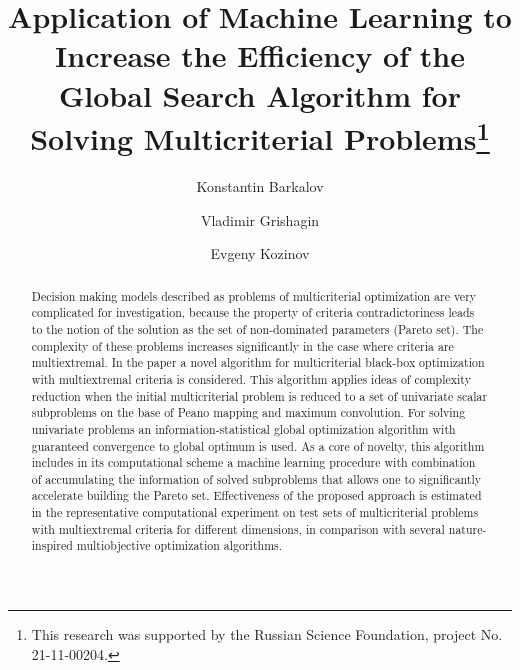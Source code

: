 \documentclass[runningheads]{llncs}
\begin{document}
%
\title{Application of Machine Learning to Increase the Efficiency of the Global Search Algorithm for Solving Multicriterial Problems\thanks{This research was supported by the Russian Science Foundation, project No. 21-11-00204.}}
%
%
\author{Konstantin Barkalov \and
Vladimir Grishagin \and
Evgeny Kozinov}
%
%

%
\maketitle              %
%
	\begin{abstract}
Decision making models described as problems of multicriterial optimization are very complicated for investigation, because the property of criteria contradictoriness leads to the notion of the solution as the set of non-dominated parameters (Pareto set). The complexity of these problems increases significantly in the case where criteria are multiextremal.
In the paper a novel algorithm for multicriterial black-box optimization with multiextremal criteria is considered. This algorithm applies ideas of complexity reduction when the initial multicriterial problem is reduced to a set of univariate scalar subproblems on the base of Peano mapping and maximum convolution. For solving univariate problems an information-statistical global optimization algorithm with guaranteed convergence to global optimum is used. As a core of novelty, this algorithm includes in its computational scheme a machine learning procedure with combination of accumulating the information of solved subproblems that allows one to significantly accelerate building the Pareto set.
Effectiveness of the proposed approach is estimated in the representative computational experiment on test sets of multicriterial problems with multiextremal criteria for different dimensions, in comparison with several nature-inspired multiobjective optimization algorithms.


\end{abstract}
%
%
%
\end{document}
